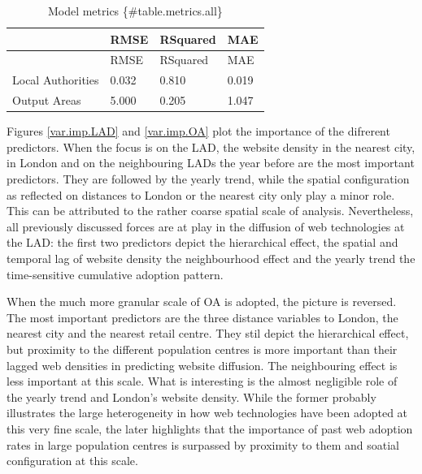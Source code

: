 \documentclass[
  authoryear,
  preprint,
  3p]{elsarticle}
\begin{document}
\begin{longtable}[]{@{}llll@{}}
\caption{Model metrics \{\#table.metrics.all\}}\tabularnewline
\toprule\noalign{}
& RMSE & RSquared & MAE \\
\midrule\noalign{}
\endfirsthead
\toprule\noalign{}
& RMSE & RSquared & MAE \\
\midrule\noalign{}
\endhead
\bottomrule\noalign{}
\endlastfoot
Local Authorities & 0.032 & 0.810 & 0.019 \\
Output Areas & 5.000 & 0.205 & 1.047 \\
\end{longtable}

Figures \ref{var.imp.LAD} and \ref{var.imp.OA} plot the importance of
the difrerent predictors. When the focus is on the LAD, the website
density in the nearest city, in London and on the neighbouring LADs the
year before are the most important predictors. They are followed by the
yearly trend, while the spatial configuration as reflected on distances
to London or the nearest city only play a minor role. This can be
attributed to the rather coarse spatial scale of analysis. Nevertheless,
all previously discussed forces are at play in the diffusion of web
technologies at the LAD: the first two predictors depict the
hierarchical effect, the spatial and temporal lag of website density the
neighbourhood effect and the yearly trend the time-sensitive cumulative
adoption pattern.

When the much more granular scale of OA is adopted, the picture is
reversed. The most important predictors are the three distance variables
to London, the nearest city and the nearest retail centre. They stil
depict the hierarchical effect, but proximity to the different
population centres is more important than their lagged web densities in
predicting website diffusion. The neighbouring effect is less important
at this scale. What is interesting is the almost negligible role of the
yearly trend and London's website density. While the former probably
illustrates the large heterogeneity in how web technologies have been
adopted at this very fine scale, the later highlights that the
importance of past web adoption rates in large population centres is
surpassed by proximity to them and soatial configuration at this scale.
\end{document}
